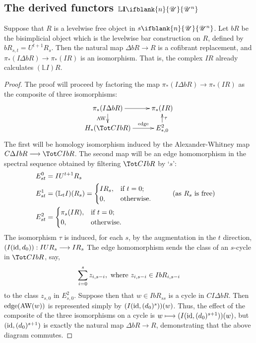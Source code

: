 \documentclass[10pt]{article}
\newcommand{\nontop}[1]{\ifblank{#1}{\scrU}{\scrU^{#1}}}
\newcommand{\Ind}[2][]{\mathbf{I}{#2}_{#1}}%
\newcommand{\derived}{\mathbb{L}}
\begin{document}
\begin{GrothendieckSpectralSequences}
\subsection{The derived functors $\derived\Ind{\nontop{n}}$}
\begin{lem*}\label{LemLevelwiseFreeWillSuffice}
Suppose that $R$ is a levelwise free object in $s\nontop{n}$. Let ${bR}$ be the bisimplicial object which is the levelwise bar construction on $R$, defined by ${bR}_{s,t}=U^{t+1}R_s$. Then the natural map $\Delta {bR}\to R$ is a cofibrant replacement, and $\pi_*(I\Delta {bR})\to\pi_*(IR)$ is an isomorphism. That is, the complex $IR$ already calculates $(\derived I)R$.
\end{lem*}
\begin{proof}
The proof will proceed by factoring the map $\pi_*(I\Delta {bR})\to\pi_*(IR)$ as the composite of three isomorphisms:
\[\xymatrix@R=4mm{
\pi_*(I\Delta {bR})
\ar[r]_-{}
\ar[d]_-{\textup{AW}}
&%
\pi_*(IR)
\\%
H_*(\Tot CI{bR})\ar[r]^-{\textup{edge}}
&%
E^2_{*,0}\ar[u]_-{\tau}
}\]
The first will be homology isomorphism induced by the Alexander-Whitney map $C\Delta I{bR}\to\Tot CI{bR}$. The second map will be an edge homomorphism in the spectral sequence obtained by filtering $\Tot CI{bR}$ by `$s$':
\begin{alignat*}{2}
E^0_{st}
&=
IU^{t+1}R_s%
\\
E^1_{st}
&=
(\derived_t I)(R_s)=\begin{cases}
IR_s,&\textup{if }t=0;\\
0,&\textup{otherwise}.
\end{cases}
&\qquad&\text{(as $R_s$ is free)}\\
E^2_{st}
&=
\begin{cases}
\pi_s(IR),&\textup{if }t=0;\\
0,&\textup{otherwise}.
\end{cases}
\end{alignat*}
The isomorphism $\tau$ is induced, for each $s$, by the augmentation in the $t$ direction, $(I(\textup{id},d_0)):IUR_s\to IR_s$ %
The edge homomorphism sends the class of an $s$-cycle in $\Tot CI{bR}$, say,
\[\sum_{i=0}^s z_{i,s-i},\textup{ where }z_{i,s-i}\in I{bR}_{i,s-i}\]
to the class $z_{s,0}$ in $E^2_{s,0}$. Suppose then that $w\in I{bR}_{ss}$ is a cycle in $CI\Delta {bR}$. Then $\textup{edge}(\textup{AW}(w))$ is represented simply by $(I(\textup{id},(d_0)^s))(w)$. Thus, the effect of the composite of the three isomorphisms on a cycle is $w\mapsto (I(\textup{id},(d_0)^{s+1}))(w)$, but $(\textup{id},(d_0)^{s+1})$ is exactly the natural map $\Delta {bR}\to R$, demonstrating that the above diagram commutes.

\end{proof}
\end{GrothendieckSpectralSequences}
\end{document}
